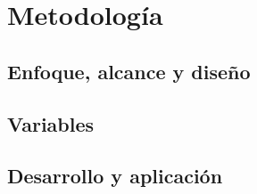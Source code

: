 \chapter{Metodología}

\section{Enfoque, alcance y diseño}

\section{Variables}

\section{Desarrollo y aplicación}
